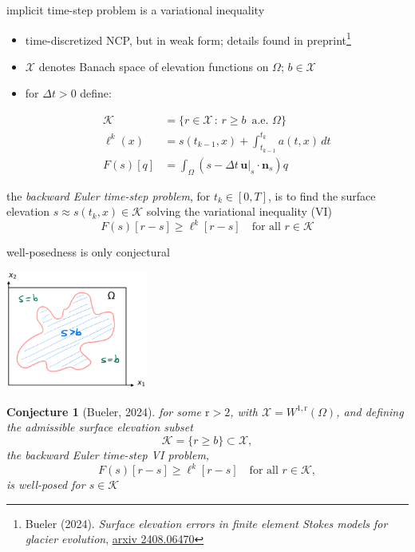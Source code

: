\documentclass[10pt,dvipsnames]{beamer}
\newtheorem*{conjecture}{Conjecture}
\newcommand{\bn}{\mathbf{n}}
\newcommand{\bu}{\mathbf{u}}
\newcommand{\cK}{\mathcal{K}}
\newcommand{\cX}{\mathcal{X}}
\newcommand{\rr}{\mathrm{r}}
\begin{document}
\begin{frame}{implicit time-step problem is a variational inequality}

\begin{itemize}
\item time-discretized NCP, but in weak form; details found in preprint\footnote{Bueler (2024). \emph{Surface elevation errors in finite element Stokes models for glacier evolution}, \href{https://www.arxiv.org/abs/2408.06470}{arxiv 2408.06470}}
\item $\cX$ denotes Banach space of elevation functions on $\Omega$; $b\in\cX$
\item for $\Delta t > 0$ define:

\vspace{-7mm}
\begin{align*}
\cK &= \{r \in \cX\,:\, r \ge b \,\text{ a.e. } \Omega\} \\
\ell^k(x) &= s(t_{k-1},x) + \int_{t_{k-1}}^{t_k} a(t,x)\,dt \\
F(s)[q] &= \int_\Omega (s - \Delta t\,\bu|_s \cdot \bn_s) q 
\end{align*}
\end{itemize}

\medskip
\begin{definition}
the \emph{backward Euler time-step problem}, for $t_k \in [0,T]$, is to find the surface elevation $s \approx s(t_k,x) \in \cK$ solving the variational inequality (VI)
$$F(s)[r-s] \ge \ell^k[r-s] \quad \text{for all } r \in \cK$$
\end{definition}

\bigskip
\end{frame}


\begin{frame}{well-posedness is only conjectural}

\hfill \includegraphics[width=0.35\textwidth]{mapplane}

\begin{conjecture}[Bueler, 2024]
for some $\rr>2$, with $\cX = W^{1,\rr}(\Omega)$, and defining the admissible surface elevation subset
    $$\cK = \{r \ge b\} \subset \cX,$$
the backward Euler time-step VI problem,
    $$F(s)[r-s] \ge \ell^k[r-s] \quad \text{for all } r \in \cK,$$
is well-posed for $s\in\cK$
\end{conjecture}
\end{frame}
\end{document}
